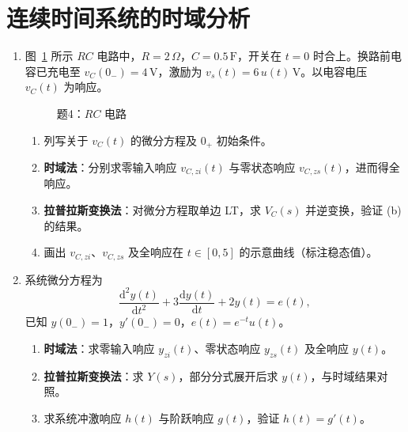 \documentclass[11pt,a4paper]{ctexart}
\newcommand{\dd}{\mathrm{d}}
\begin{document}
\section{连续时间系统的时域分析}

\begin{enumerate}[label=\textbf{题\arabic*.},leftmargin=*,itemsep=1.2em,start=4]

\item \label{q:4}
图~\ref{fig:q4-rc} 所示 $RC$ 电路中，$R=2\,\Omega$，$C=0.5\,\mathrm{F}$，开关在 $t=0$ 时合上。换路前电容已充电至 $v_C(0_-)=4\,\mathrm{V}$，激励为 $v_s(t)=6\,u(t)\,\mathrm{V}$。以电容电压 $v_C(t)$ 为响应。
\begin{figure}[htbp]
\centering
{}
\caption{题4：$RC$ 电路}
\label{fig:q4-rc}
\end{figure}
\begin{enumerate}[label=(\alph*)]
    \item 列写关于 $v_C(t)$ 的微分方程及 $0_+$ 初始条件。
    \item \textbf{时域法}：分别求零输入响应 $v_{C,zi}(t)$ 与零状态响应 $v_{C,zs}(t)$，进而得全响应。
    \item \textbf{拉普拉斯变换法}：对微分方程取单边 LT，求 $V_C(s)$ 并逆变换，验证 (b) 的结果。
    \item 画出 $v_{C,zi}$、$v_{C,zs}$ 及全响应在 $t\in[0,5]$ 的示意曲线（标注稳态值）。
\end{enumerate}

\item \label{q:5}
系统微分方程为
\[
\frac{\dd^2 y(t)}{\dd t^2} + 3\frac{\dd y(t)}{\dd t} + 2y(t) = e(t),
\]
已知 $y(0_-)=1$，$y'(0_-)=0$，$e(t)=e^{-t}u(t)$。
\begin{enumerate}[label=(\alph*)]
    \item \textbf{时域法}：求零输入响应 $y_{zi}(t)$、零状态响应 $y_{zs}(t)$ 及全响应 $y(t)$。
    \item \textbf{拉普拉斯变换法}：求 $Y(s)$，部分分式展开后求 $y(t)$，与时域结果对照。
    \item 求系统冲激响应 $h(t)$ 与阶跃响应 $g(t)$，验证 $h(t)=g'(t)$。
\end{enumerate}


\end{enumerate}
\end{document}
